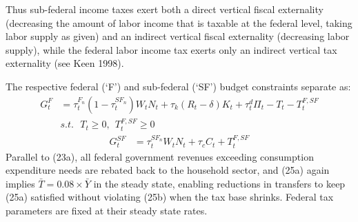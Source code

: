\documentclass[12pt,letterpaper]{article}
\begin{document}
Thus sub-federal income taxes exert both a direct vertical fiscal externality (decreasing the amount of labor income that is taxable at the federal level, taking labor supply as given) and an indirect vertical fiscal externality (decreasing labor supply), while the federal labor income tax exerts only an indirect vertical tax externality (see Keen 1998).

The respective federal (`F') and sub-federal (`SF') budget constraints separate as:
\begin{subequations} 
\begin{align}
G^F_t &= \tau^{F_n}_t (1 - \tau^{SF_n}_t) W_t N_t + \tau_k (R_t - \delta) K_t + \tau_t^d \Pi_t - T_t - T^{F,SF}_t \\  
& s.t. \ \ \  T_t \geq 0, \ \ T^{F,SF}_t \geq 0
\end{align}
\end{subequations} 
\begin{align}
G^{SF}_t &= \tau^{SF_n}_t W_t N_t + \tau_c C_t  + T^{F,SF}_t  
\end{align}
Parallel to (23a), all federal government revenues exceeding consumption expenditure needs are rebated back to the household sector, and (25a) again implies $\bar{T} = 0.08 \times \bar{Y}$ in the steady state, enabling reductions in transfers to keep (25a) satisfied without violating (25b) when the tax base shrinks. Federal tax parameters are fixed at their steady state rates.
\end{document}
